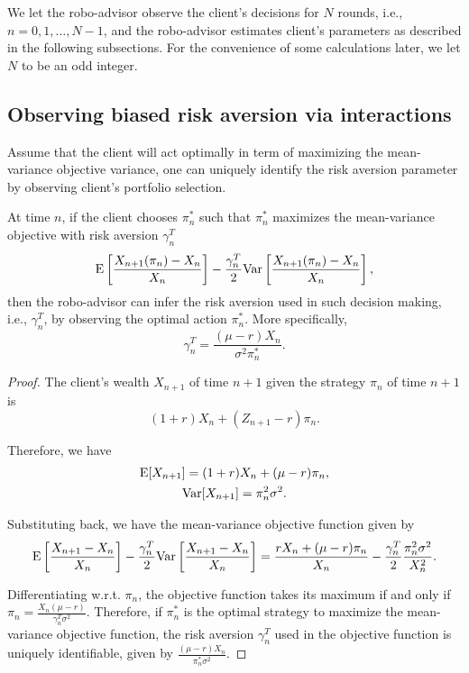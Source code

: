 We let the robo-advisor observe the client's decisions for $N$ rounds, i.e., $n=0,1,\ldots,N-1$, and the robo-advisor estimates client's parameters as described in the following subsections. For the convenience of some calculations later, we let $N$ to be an odd integer.

\subsection{Observing biased risk aversion via interactions}
Assume that the client will act optimally in term of maximizing the mean-variance objective variance, one can uniquely identify the risk aversion parameter by observing client's portfolio selection.
\begin{theorem}\label{thm:action2gamma} At time $n$, if the client chooses $\pi_n^*$ such that $\pi_n^*$ maximizes the mean-variance objective with risk aversion $\gamma_n^T$ $$\mathrm{E}\left[\frac{X_{n+1}(\pi_n)-X_n}{X_n}\right]-\frac{\gamma_n^T}{2}\mathrm{Var}\left[\frac{X_{n+1}(\pi_n)-X_n}{X_n}\right],$$ then the robo-advisor can infer the risk aversion used in such decision making, i.e., $\gamma_n^T$, by observing the optimal action $\pi_n^*$. More specifically, $$\gamma_n^T=\frac{(\mu-r)X_n}{\sigma^2 \pi_n^*}.$$
\end{theorem}

\begin{proof}

The client's wealth $X_{n+1}$ of time $n+1$ given the strategy $\pi_n$ of time $n+1$ is \begin{equation}(1+r)X_n+(Z_{n+1}-r)\pi_n.\end{equation}

Therefore, we have \begin{gather*}
    \mathrm{E}[X_{n+1}]=(1+r)X_n + (\mu-r)\pi_n,\\
    \mathrm{Var}[X_{n+1}]=\pi_n^2\sigma^2.
\end{gather*}

Substituting back, we have 
the mean-variance objective function given by $$
\begin{aligned}
\mathrm{E}\left[\frac{X_{n+1}-X_n}{X_n}\right]-\frac{\gamma_n^T}{2}\mathrm{Var}\left[\frac{X_{n+1}-X_n}{X_n}\right]=\frac{rX_n+(\mu-r)\pi_n}{X_n}-\frac{\gamma_n^T}{2}\frac{\pi_n^2\sigma^2}{X_n^2}.
\end{aligned}
$$

Differentiating w.r.t. $\pi_n$, the objective function takes its maximum if and only if $\pi_n=\frac{X_n (\mu-r)}{\gamma_n^T\sigma^2}$. Therefore, if $\pi_n^*$ is the optimal strategy to maximize the mean-variance objective function, the risk aversion $\gamma_n^T$ used in the objective function is uniquely identifiable, given by $
\frac{(\mu-r)X_n}{\pi_n^*\sigma^2}
$.
\end{proof}


